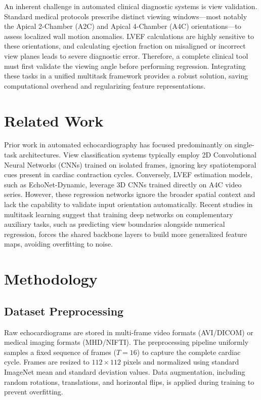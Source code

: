 \documentclass[journal]{IEEEtran}
\begin{document}
An inherent challenge in automated clinical diagnostic systems is view validation. Standard medical protocols prescribe distinct viewing windows---most notably the Apical 2-Chamber (A2C) and Apical 4-Chamber (A4C) orientations---to assess localized wall motion anomalies. LVEF calculations are highly sensitive to these orientations, and calculating ejection fraction on misaligned or incorrect view planes leads to severe diagnostic error. Therefore, a complete clinical tool must first validate the viewing angle before performing regression. Integrating these tasks in a unified multitask framework provides a robust solution, saving computational overhead and regularizing feature representations.

\section{Related Work}
Prior work in automated echocardiography has focused predominantly on single-task architectures. View classification systems typically employ 2D Convolutional Neural Networks (CNNs) trained on isolated frames, ignoring key spatiotemporal cues present in cardiac contraction cycles. Conversely, LVEF estimation models, such as EchoNet-Dynamic, leverage 3D CNNs trained directly on A4C video series. However, these regression networks ignore the broader spatial context and lack the capability to validate input orientation automatically. Recent studies in multitask learning suggest that training deep networks on complementary auxiliary tasks, such as predicting view boundaries alongside numerical regression, forces the shared backbone layers to build more generalized feature maps, avoiding overfitting to noise.

\section{Methodology}

\subsection{Dataset Preprocessing}
Raw echocardiograms are stored in multi-frame video formats (AVI/DICOM) or medical imaging formats (MHD/NIFTI). The preprocessing pipeline uniformly samples a fixed sequence of frames ($T=16$) to capture the complete cardiac cycle. Frames are resized to $112 \times 112$ pixels and normalized using standard ImageNet mean and standard deviation values. Data augmentation, including random rotations, translations, and horizontal flips, is applied during training to prevent overfitting.
\end{document}

